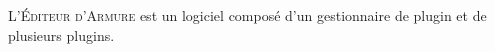 

L'\textsc{\'Editeur d'Armure} est un logiciel composé d'un gestionnaire de plugin et de plusieurs plugins.
